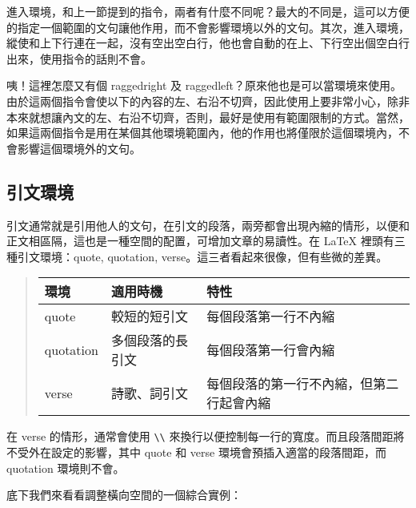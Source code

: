 進入環境，和上一節提到的指令，兩者有什麼不同呢？最大的不同是，這可以方便的指定一個範圍的文句讓他作用，而不會影響環境以外的文句。其次，進入環境，縱使和上下行連在一起，沒有空出空白行，他也會自動的在上、下行空出個空白行出來，使用指令的話則不會。

咦！這裡怎麼又有個 {\ttfamily raggedright} 及 {\ttfamily raggedleft}？原來他也是可以當環境來使用。由於這兩個指令會使以下的內容的左、右沿不切齊，因此使用上要非常小心，除非本來就想讓內文的左、右沿不切齊，否則，最好是使用有範圍限制的方式。當然，如果這兩個指令是用在某個其他環境範圍內，他的作用也將僅限於這個環境內，不會影響這個環境外的文句。

\subsection{引文環境}

引文通常就是引用他人的文句，在引文的段落，兩旁都會出現內縮的情形，以便和正文相區隔，這也是一種空間的配置，可增加文章的易讀性。在 \LaTeX{} 裡頭有三種引文環境：{\ttfamily quote}, {\ttfamily quotation}, {\ttfamily verse}。這三者看起來很像，但有些微的差異。

\begin{quote}
   \begin{tabular}{>{\ttfamily }lll}
      環境      & 適用時機         & 特性                                     \\
      \hline
      quote     & 較短的短引文     & 每個段落第一行不內縮                     \\
      quotation & 多個段落的長引文 & 每個段落第一行會內縮                     \\
      verse     & 詩歌、詞引文     & 每個段落的第一行不內縮，但第二行起會內縮 \\
   \end{tabular}
\end{quote}
%

在 {\ttfamily verse} 的情形，通常會使用 \verb=\\=\index{\\@\verb=\\=} 來換行以便控制每一行的寬度。而且段落間距將不受外在設定的影響，其中 {\ttfamily quote} 和 {\ttfamily verse} 環境會預插入適當的段落間距，而 {\ttfamily quotation} 環境則不會。

底下我們來看看調整橫向空間的一個綜合實例：

